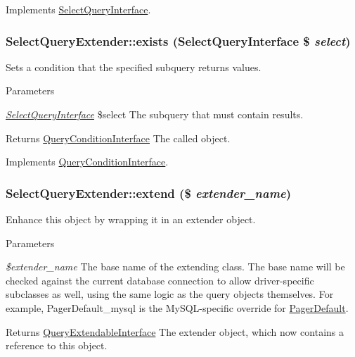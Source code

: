 Implements \hyperlink{interfaceSelectQueryInterface_aae70694b2ee2b596a7b7d3e2c25814ee}{SelectQueryInterface}.\hypertarget{classSelectQueryExtender_aa250c6c085e53ac64607649f75b5f468}{
\subsubsection[{exists}]{\setlength{\rightskip}{0pt plus 5cm}SelectQueryExtender::exists ({\bf SelectQueryInterface} \$ {\em select})}}
\label{classSelectQueryExtender_aa250c6c085e53ac64607649f75b5f468}
Sets a condition that the specified subquery returns values.


\begin{DoxyParams}{Parameters}
\item[{\em \hyperlink{interfaceSelectQueryInterface}{SelectQueryInterface}}]\$select The subquery that must contain results.\end{DoxyParams}
\begin{DoxyReturn}{Returns}
\hyperlink{interfaceQueryConditionInterface}{QueryConditionInterface} The called object. 
\end{DoxyReturn}


Implements \hyperlink{interfaceQueryConditionInterface_a27a52b6e84393275ad2c54eaf1bd764a}{QueryConditionInterface}.\hypertarget{classSelectQueryExtender_aff046880c8c40a7037f1cade3f765666}{
\subsubsection[{extend}]{\setlength{\rightskip}{0pt plus 5cm}SelectQueryExtender::extend (\$ {\em extender\_\-name})}}
\label{classSelectQueryExtender_aff046880c8c40a7037f1cade3f765666}
Enhance this object by wrapping it in an extender object.


\begin{DoxyParams}{Parameters}
\item[{\em \$extender\_\-name}]The base name of the extending class. The base name will be checked against the current database connection to allow driver-\/specific subclasses as well, using the same logic as the query objects themselves. For example, PagerDefault\_\-mysql is the MySQL-\/specific override for \hyperlink{classPagerDefault}{PagerDefault}. \end{DoxyParams}
\begin{DoxyReturn}{Returns}
\hyperlink{interfaceQueryExtendableInterface}{QueryExtendableInterface} The extender object, which now contains a reference to this object. 
\end{DoxyReturn}


